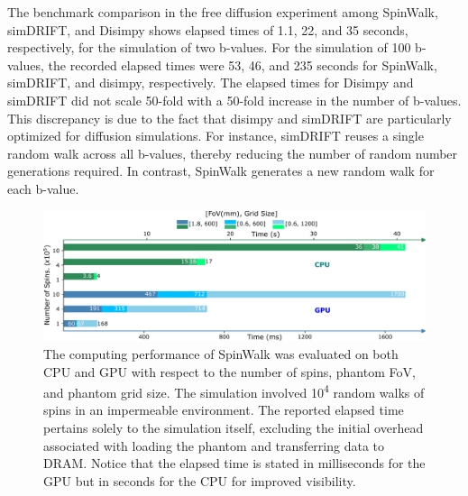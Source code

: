 The benchmark comparison in the free diffusion experiment among SpinWalk, simDRIFT, and Disimpy shows elapsed times of 1.1, 22, and 35 seconds, respectively, for the simulation of two b-values. For the simulation of 100 b-values, the recorded elapsed times were 53, 46, and 235 seconds for SpinWalk, simDRIFT, and disimpy, respectively. The elapsed times for Disimpy and simDRIFT did not scale 50-fold with a 50-fold increase in the number of b-values. This discrepancy is due to the fact that disimpy and simDRIFT are particularly optimized for diffusion simulations. For instance, simDRIFT reuses a single random walk across all b-values, thereby reducing the number of random number generations required. In contrast, SpinWalk generates a new random walk for each b-value.


\begin{figure}[!htbp]
    \centering
    \includegraphics[width=\textwidth]{fig9_benchmark.pdf}
    \caption{The computing performance of SpinWalk was evaluated on both CPU and GPU with respect to the number of spins, phantom FoV, and phantom grid size. The simulation involved 10\textsuperscript{4} random walks of spins in an impermeable environment. The reported elapsed time pertains solely to the simulation itself, excluding the initial overhead associated with loading the phantom and transferring data to DRAM. Notice that the elapsed time is stated in milliseconds for the GPU but in seconds for the CPU for improved visibility.}
    \label{fig:benchmark}
\end{figure}

